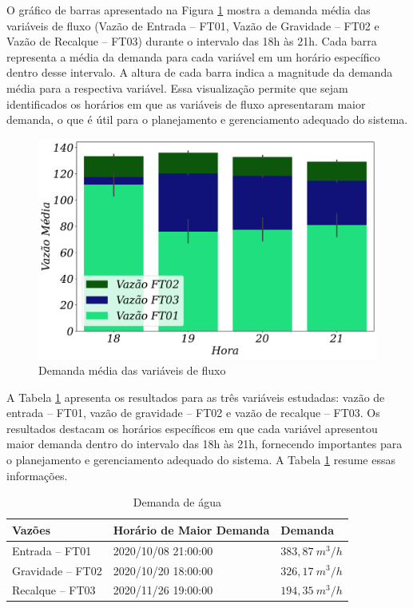 O gráfico de barras apresentado na Figura \ref{fig:grafico-barras-demanda} mostra a demanda média das variáveis de fluxo (Vazão de Entrada -- FT01, Vazão de Gravidade -- FT02 e Vazão de Recalque -- FT03) durante o intervalo das 18h às 21h. Cada barra representa a média da demanda para cada variável em um horário específico dentro desse intervalo. A altura de cada barra indica a magnitude da demanda média para a respectiva variável. Essa visualização permite que sejam identificados os horários em que as variáveis de fluxo apresentaram maior demanda, o que é útil para o planejamento e gerenciamento adequado do sistema.

\begin{figure}[!htb]
	\centering
	\caption{Demanda média das variáveis de fluxo}
	\includegraphics[width=0.7\linewidth]{Resultados/Figuras/grafico-barras-demanda}
	
	\label{fig:grafico-barras-demanda}
	
	
\end{figure}

A Tabela \ref{tb:dem} apresenta os resultados para as três variáveis estudadas: vazão de entrada -- FT01, vazão de gravidade -- FT02 e vazão de recalque -- FT03.
Os resultados destacam os horários específicos em que cada variável apresentou maior demanda dentro do intervalo das 18h às 21h, fornecendo importantes para o planejamento e gerenciamento adequado do sistema. A Tabela \ref{tb:dem} resume essas informações.



\begin{table}[!htb]
	\centering
	\caption{Demanda de água}\label{tb:dem}
	\begin{tabular}{@{}lll@{}}
		\toprule
		\textbf{Vazões}         & \textbf{Horário de Maior Demanda} & \textbf{Demanda} \\ \midrule
		Entrada -- FT01   & 2020/10/08 21:00:00               & $383,87 \ m^3/h$                   \\
		Gravidade -- FT02 & 2020/10/20 18:00:00               & $326,17 \ m^3/h$                    \\
		Recalque -- FT03  & 2020/11/26 19:00:00               & $194,35 \ m^3/h$                    \\ \bottomrule
	\end{tabular}
	
	
\end{table}


